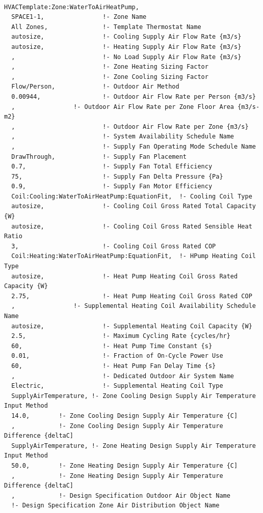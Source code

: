 \begin{lstlisting}

HVACTemplate:Zone:WaterToAirHeatPump,
  SPACE1-1,                !- Zone Name
  All Zones,               !- Template Thermostat Name
  autosize,                !- Cooling Supply Air Flow Rate {m3/s}
  autosize,                !- Heating Supply Air Flow Rate {m3/s}
  ,                        !- No Load Supply Air Flow Rate {m3/s}
  ,                        !- Zone Heating Sizing Factor
  ,                        !- Zone Cooling Sizing Factor
  Flow/Person,             !- Outdoor Air Method
  0.00944,                 !- Outdoor Air Flow Rate per Person {m3/s}
  ,                !- Outdoor Air Flow Rate per Zone Floor Area {m3/s-m2}
  ,                        !- Outdoor Air Flow Rate per Zone {m3/s}
  ,                        !- System Availability Schedule Name
  ,                        !- Supply Fan Operating Mode Schedule Name
  DrawThrough,             !- Supply Fan Placement
  0.7,                     !- Supply Fan Total Efficiency
  75,                      !- Supply Fan Delta Pressure {Pa}
  0.9,                     !- Supply Fan Motor Efficiency
  Coil:Cooling:WaterToAirHeatPump:EquationFit,  !- Cooling Coil Type
  autosize,                !- Cooling Coil Gross Rated Total Capacity {W}
  autosize,                !- Cooling Coil Gross Rated Sensible Heat Ratio
  3,                       !- Cooling Coil Gross Rated COP
  Coil:Heating:WaterToAirHeatPump:EquationFit,  !- HPump Heating Coil Type
  autosize,                !- Heat Pump Heating Coil Gross Rated Capacity {W}
  2.75,                    !- Heat Pump Heating Coil Gross Rated COP
  ,                !- Supplemental Heating Coil Availability Schedule Name
  autosize,                !- Supplemental Heating Coil Capacity {W}
  2.5,                     !- Maximum Cycling Rate {cycles/hr}
  60,                      !- Heat Pump Time Constant {s}
  0.01,                    !- Fraction of On-Cycle Power Use
  60,                      !- Heat Pump Fan Delay Time {s}
  ,                        !- Dedicated Outdoor Air System Name
  Electric,                !- Supplemental Heating Coil Type
  SupplyAirTemperature, !- Zone Cooling Design Supply Air Temperature Input Method
  14.0,        !- Zone Cooling Design Supply Air Temperature {C]
  ,            !- Zone Cooling Design Supply Air Temperature Difference {deltaC]
  SupplyAirTemperature, !- Zone Heating Design Supply Air Temperature Input Method
  50.0,        !- Zone Heating Design Supply Air Temperature {C]
  ,            !- Zone Heating Design Supply Air Temperature Difference {deltaC]
  ,            !- Design Specification Outdoor Air Object Name
  !- Design Specification Zone Air Distribution Object Name
\end{lstlisting}

